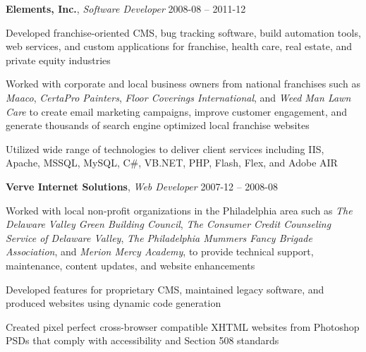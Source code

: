 \documentclass[12pt,a4paper]{article}
\newcommand{\workhead}[3]{\textbf{#1}, \emph{#2} \hfill #3}
\newcommand{\li}{\item[--]}
\begin{document}
\begin{description}[leftmargin=0em]
    \item
        \workhead{Elements, Inc.}{Software Developer}{2008-08 -- 2011-12}
        \begin{itemize*}
            \li Developed franchise-oriented CMS, bug tracking software, build automation tools, web services, and custom applications for franchise, health care, real estate, and private equity industries
            \li Worked with corporate and local business owners from national franchises such as \emph{Maaco}, \emph{\mbox{CertaPro} Painters}, \emph{Floor Coverings International}, and \emph{Weed Man Lawn Care} to create email marketing campaigns, improve customer engagement, and generate thousands of search engine optimized local franchise websites
            \li Utilized wide range of technologies to deliver client services including IIS, Apache, MSSQL, MySQL, C\#, VB.NET, PHP, Flash, Flex, and Adobe AIR
        \end{itemize*}

    \item
        \workhead{Verve Internet Solutions}{Web Developer}{2007-12 -- 2008-08}
        \begin{itemize*}
            \li Worked with local non-profit organizations in the Philadelphia area such as \emph{The Delaware Valley Green Building Council}, \emph{The Consumer Credit Counseling Service of Delaware Valley}, \emph{The Philadelphia Mummers Fancy Brigade Association}, and \emph{Merion Mercy Academy}, to provide technical support, maintenance, content updates, and website enhancements
            \li Developed features for proprietary CMS, maintained legacy software, and produced websites using dynamic code generation
            \li Created pixel perfect cross-browser compatible XHTML websites from Photoshop PSDs that comply with accessibility and Section 508 standards
        \end{itemize*}




\end{description}
\end{document}
